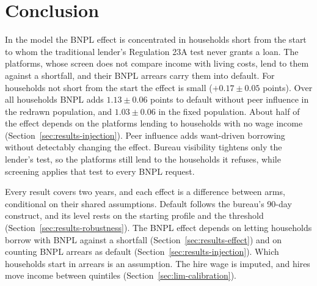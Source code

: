 \section{Conclusion}
\label{sec:conclusion}
\enlargethispage{\baselineskip} %


In the model the \ac{BNPL} effect is concentrated in households short from the start to whom the
traditional lender's Regulation 23A test never grants a loan. The platforms, whose screen does not
compare income with living costs, lend to them against a shortfall, and their \ac{BNPL} arrears
carry them into default. For households not short from the start the effect is small
($+0.17 \pm 0.05$ points). Over all households \ac{BNPL} adds $1.13 \pm 0.06$ points to default
without peer influence in the redrawn population, and $1.03 \pm 0.06$ in the fixed population. About half of the effect
depends on the platforms lending to households with no wage income
(Section~\ref{sec:results-injection}). Peer influence adds want-driven borrowing without
detectably changing the effect. Bureau visibility tightens only the lender's test, so the platforms still lend to the
households it refuses, while screening applies that test to every \ac{BNPL} request.

Every result covers two years, and each effect is a difference between arms, conditional on
their shared assumptions. Default follows the bureau's 90-day construct, and its level rests on the starting profile and the threshold (Section~\ref{sec:results-robustness}). The
\ac{BNPL} effect depends on letting households borrow with \ac{BNPL} against a shortfall
(Section~\ref{sec:results-effect}) and on counting \ac{BNPL} arrears as default
(Section~\ref{sec:results-injection}). Which households start in arrears is an assumption. The
hire wage is imputed, and hires move income between quintiles (Section~\ref{sec:lim-calibration}).

